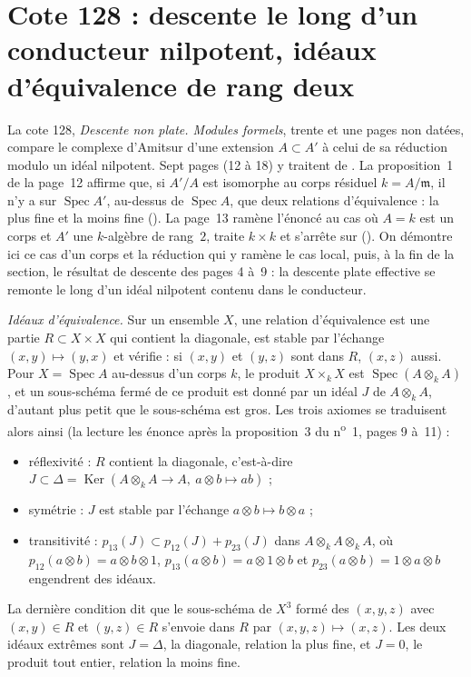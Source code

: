 \section[Cote 128 : descente le long d'un conducteur nilpotent, idéaux d'équivalence de rang deux]{Cote 128 : descente le long d'un conducteur nilpotent, idéaux d'équivalence de rang deux\protect{}}\label{sec:128}

La cote 128, \emph{Descente non plate. Modules formels}, trente et une pages non datées, compare le complexe d'Amitsur d'une extension $A \subset A'$ à celui de sa réduction modulo un idéal nilpotent. Sept pages (12 à 18) y traitent de . La proposition~1 de la page~12 affirme que, si $A'/A$ est isomorphe au corps résiduel $k = A/\mathfrak m$, il n'y a sur $\operatorname{Spec} A'$, au-dessus de $\operatorname{Spec} A$, que deux relations d'équivalence : la plus fine et la moins fine (). La page~13 ramène l'énoncé au cas où $A = k$ est un corps et $A'$ une $k$-algèbre de rang~$2$, traite $k \times k$ et s'arrête sur  (). On démontre ici ce cas d'un corps et la réduction qui y ramène le cas local, puis, à la fin de la section, le résultat de descente des pages 4 à~9 : la descente plate effective se remonte le long d'un idéal nilpotent contenu dans le conducteur.

\noindent\emph{Idéaux d'équivalence.} Sur un ensemble $X$, une relation d'équivalence est une partie $R \subset X \times X$ qui contient la diagonale, est stable par l'échange $(x, y) \mapsto (y, x)$ et vérifie : si $(x, y)$ et $(y, z)$ sont dans $R$, $(x, z)$ aussi. Pour $X = \operatorname{Spec} A$ au-dessus d'un corps $k$, le produit $X \times_k X$ est $\operatorname{Spec}(A \otimes_k A)$, et un sous-schéma fermé de ce produit est donné par un idéal $J$ de $A \otimes_k A$, d'autant plus petit que le sous-schéma est gros. Les trois axiomes se traduisent alors ainsi (la lecture les énonce après la proposition~3 du n\textsuperscript{o}~1, pages 9 à~11) :
\begin{itemize}
\item réflexivité : $R$ contient la diagonale, c'est-à-dire $J \subset \Delta = \operatorname{Ker}(A \otimes_k A \to A, \ a \otimes b \mapsto ab)$ ;
\item symétrie : $J$ est stable par l'échange $a \otimes b \mapsto b \otimes a$ ;
\item transitivité : $p_{13}(J) \subset p_{12}(J) + p_{23}(J)$ dans $A \otimes_k A \otimes_k A$, où $p_{12}(a \otimes b) = a \otimes b \otimes 1$, $p_{13}(a \otimes b) = a \otimes 1 \otimes b$ et $p_{23}(a \otimes b) = 1 \otimes a \otimes b$ engendrent des idéaux.
\end{itemize}
La dernière condition dit que le sous-schéma de $X^3$ formé des $(x, y, z)$ avec $(x, y) \in R$ et $(y, z) \in R$ s'envoie dans $R$ par $(x, y, z) \mapsto (x, z)$. Les deux idéaux extrêmes sont $J = \Delta$, la diagonale, relation la plus fine, et $J = 0$, le produit tout entier, relation la moins fine.

